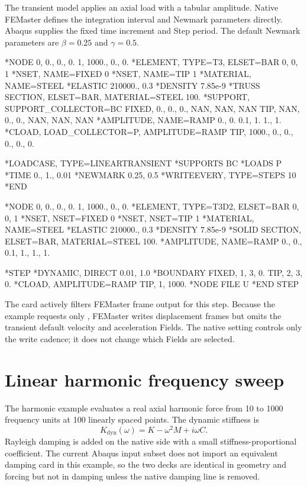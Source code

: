 The transient model applies an axial load with a tabular amplitude. Native FEMaster defines the integration interval and Newmark parameters directly. Abaqus  supplies the fixed time increment and Step period. The default Newmark parameters are \(\beta=0.25\) and \(\gamma=0.5\).

\begin{dialectexamples}
\begin{femasterdeck}
*NODE
0,    0., 0., 0.
1, 1000., 0., 0.
*ELEMENT, TYPE=T3, ELSET=BAR
0, 0, 1
*NSET, NAME=FIXED
0
*NSET, NAME=TIP
1
*MATERIAL, NAME=STEEL
*ELASTIC
210000., 0.3
*DENSITY
7.85e-9
*TRUSS SECTION, ELSET=BAR, MATERIAL=STEEL
100.
*SUPPORT, SUPPORT_COLLECTOR=BC
FIXED, 0., 0., 0., NAN, NAN, NAN
TIP, NAN, 0., 0., NAN, NAN, NAN
*AMPLITUDE, NAME=RAMP
0., 0.
0.1, 1.
1., 1.
*CLOAD, LOAD_COLLECTOR=P, AMPLITUDE=RAMP
TIP, 1000., 0., 0., 0., 0., 0.

*LOADCASE, TYPE=LINEARTRANSIENT
*SUPPORTS
BC
*LOADS
P
*TIME
0., 1., 0.01
*NEWMARK
0.25, 0.5
*WRITEEVERY, TYPE=STEPS
10
*END
\end{femasterdeck}
\begin{abaqusdeck}
*NODE
0,    0., 0., 0.
1, 1000., 0., 0.
*ELEMENT, TYPE=T3D2, ELSET=BAR
0, 0, 1
*NSET, NSET=FIXED
0
*NSET, NSET=TIP
1
*MATERIAL, NAME=STEEL
*ELASTIC
210000., 0.3
*DENSITY
7.85e-9
*SOLID SECTION, ELSET=BAR, MATERIAL=STEEL
100.
*AMPLITUDE, NAME=RAMP
0., 0., 0.1, 1., 1., 1.

*STEP
*DYNAMIC, DIRECT
0.01, 1.0
*BOUNDARY
FIXED, 1, 3, 0.
TIP, 2, 3, 0.
*CLOAD, AMPLITUDE=RAMP
TIP, 1, 1000.
*NODE FILE
U
*END STEP
\end{abaqusdeck}
\end{dialectexamples}

The  card actively filters FEMaster frame output for this step. Because the example requests only , FEMaster writes displacement frames but omits the transient default velocity and acceleration Fields. The native  setting controls only the write cadence; it does not change which Fields are selected.

\section{Linear harmonic frequency sweep}

The harmonic example evaluates a real axial harmonic force from 10 to 1000 frequency units at 100 linearly spaced points. The dynamic stiffness is
\[
K_\mathrm{dyn}(\omega)=K-\omega^2M+i\omega C.
\]
Rayleigh damping is added on the native side with a small stiffness-proportional coefficient. The current Abaqus input subset does not import an equivalent damping card in this example, so the two decks are identical in geometry and forcing but not in damping unless the native damping line is removed.

